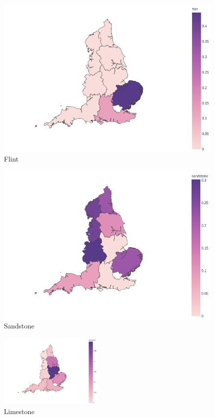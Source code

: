 \documentclass[11pt]{article}
\begin{document}
\begin{minipage}{0.45\textwidth}
	\begin{figure}[H]
		\centering
		\includegraphics[width=\textwidth]{flint.png}
		\caption{Flint}
	\end{figure}
\end{minipage}
\begin{minipage}{0.45\textwidth}
	\begin{figure}[H]
		\centering
		\includegraphics[width=\textwidth]{sandstone.png}
		\caption{Sandstone}
	\end{figure}
\end{minipage}
\begin{figure}[H]
	\centering
	\includegraphics[width=0.45\textwidth]{limestone.png}
	\caption{Limestone}
\end{figure}
\end{document}
